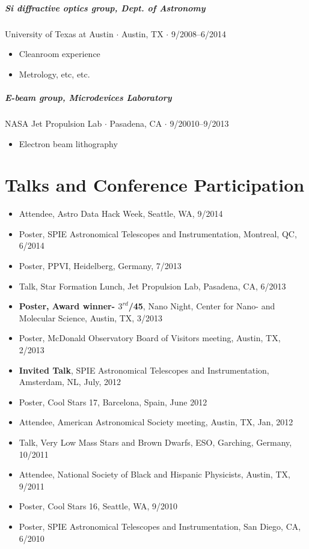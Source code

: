 \documentclass[10pt,letterpaper]{article}
\begin{document}
\subparagraph{Si diffractive optics group, Dept. of Astronomy}
University of Texas at Austin $\cdot$ Austin, TX $\cdot$ 9/2008--6/2014
\begin{itemize}
    \item Cleanroom experience
    \item Metrology, etc, etc.
\end{itemize}

\subparagraph{E-beam group, Microdevices Laboratory}
NASA Jet Propulsion Lab $\cdot$ Pasadena, CA $\cdot$ 9/20010--9/2013
\begin{itemize}
    \item Electron beam lithography
\end{itemize}




\section*{Talks and Conference Participation}

\begin{itemize}
    \item Attendee, Astro Data Hack Week, Seattle, WA, 9/2014
    \item Poster, SPIE Astronomical Telescopes and Instrumentation, Montreal, QC, 6/2014
    \item Poster, PPVI, Heidelberg, Germany, 7/2013
    \item Talk, Star Formation Lunch, Jet Propulsion Lab, Pasadena, CA, 6/2013
    \item \textbf{Poster, Award winner- $3^{rd}$/45}, Nano Night, Center for Nano- and Molecular Science, Austin, TX, 3/2013
    \item Poster, McDonald Observatory Board of Visitors meeting, Austin, TX, 2/2013 
    \item \textbf{Invited Talk}, SPIE Astronomical Telescopes and Instrumentation, Amsterdam, NL, July, 2012
    \item Poster, Cool Stars 17, Barcelona, Spain, June 2012
    \item Attendee, American Astronomical Society meeting, Austin, TX, Jan, 2012
    \item Talk, Very Low Mass Stars and Brown Dwarfs, ESO, Garching, Germany, 10/2011
    \item Attendee, National Society of Black and Hispanic Physicists, Austin, TX, 9/2011
    \item Poster, Cool Stars 16, Seattle, WA, 9/2010
    \item Poster, SPIE Astronomical Telescopes and Instrumentation, San Diego, CA, 6/2010
\end{itemize}
\end{document}
